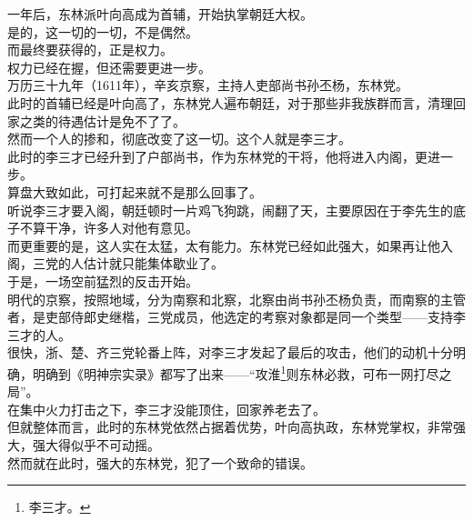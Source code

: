\begin{multicols}{\theparacolNo}
一年后，东林派叶向高成为首辅，开始执掌朝廷大权。\\

是的，这一切的一切，不是偶然。\\

而最终要获得的，正是权力。\\

权力已经在握，但还需要更进一步。\\

万历三十九年（1611年），辛亥京察，主持人吏部尚书孙丕杨，东林党。\\

此时的首辅已经是叶向高了，东林党人遍布朝廷，对于那些非我族群而言，清理回家之类的待遇估计是免不了了。\\

然而一个人的掺和，彻底改变了这一切。这个人就是李三才。\\

此时的李三才已经升到了户部尚书，作为东林党的干将，他将进入内阁，更进一步。\\

算盘大致如此，可打起来就不是那么回事了。\\

听说李三才要入阁，朝廷顿时一片鸡飞狗跳，闹翻了天，主要原因在于李先生的底子不算干净，许多人对他有意见。\\

而更重要的是，这人实在太猛，太有能力。东林党已经如此强大，如果再让他入阁，三党的人估计就只能集体歇业了。\\

于是，一场空前猛烈的反击开始。\\

明代的京察，按照地域，分为南察和北察，北察由尚书孙丕杨负责，而南察的主管者，是吏部侍郎史继楷，三党成员，他选定的考察对象都是同一个类型——支持李三才的人。\\

很快，浙、楚、齐三党轮番上阵，对李三才发起了最后的攻击，他们的动机十分明确，明确到《明神宗实录》都写了出来——“攻淮\footnote{李三才。}则东林必救，可布一网打尽之局”。\\

在集中火力打击之下，李三才没能顶住，回家养老去了。\\

但就整体而言，此时的东林党依然占据着优势，叶向高执政，东林党掌权，非常强大，强大得似乎不可动摇。\\

然而就在此时，强大的东林党，犯了一个致命的错误。\\


\end{multicols}

